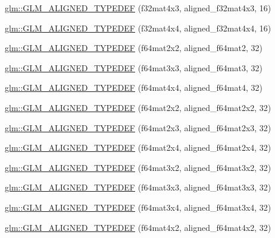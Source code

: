 \begin{DoxyCompactItemize}
\item 
\hyperlink{group__gtx__type__aligned_ga9476ef66790239df53dbe66f3989c3b5}{glm\+::\+G\+L\+M\+\_\+\+A\+L\+I\+G\+N\+E\+D\+\_\+\+T\+Y\+P\+E\+D\+E\+F} (f32mat4x3, aligned\+\_\+f32mat4x3, 16)
\item 
\hyperlink{group__gtx__type__aligned_gacc429b3b0b49921e12713b6d31e14e1d}{glm\+::\+G\+L\+M\+\_\+\+A\+L\+I\+G\+N\+E\+D\+\_\+\+T\+Y\+P\+E\+D\+E\+F} (f32mat4x4, aligned\+\_\+f32mat4x4, 16)
\item 
\hyperlink{group__gtx__type__aligned_ga88f6c6fa06e6e64479763e69444669cf}{glm\+::\+G\+L\+M\+\_\+\+A\+L\+I\+G\+N\+E\+D\+\_\+\+T\+Y\+P\+E\+D\+E\+F} (f64mat2x2, aligned\+\_\+f64mat2, 32)
\item 
\hyperlink{group__gtx__type__aligned_gaae8e4639c991e64754145ab8e4c32083}{glm\+::\+G\+L\+M\+\_\+\+A\+L\+I\+G\+N\+E\+D\+\_\+\+T\+Y\+P\+E\+D\+E\+F} (f64mat3x3, aligned\+\_\+f64mat3, 32)
\item 
\hyperlink{group__gtx__type__aligned_ga6e9094f3feb3b5b49d0f83683a101fde}{glm\+::\+G\+L\+M\+\_\+\+A\+L\+I\+G\+N\+E\+D\+\_\+\+T\+Y\+P\+E\+D\+E\+F} (f64mat4x4, aligned\+\_\+f64mat4, 32)
\item 
\hyperlink{group__gtx__type__aligned_gadbd2c639c03de1c3e9591b5a39f65559}{glm\+::\+G\+L\+M\+\_\+\+A\+L\+I\+G\+N\+E\+D\+\_\+\+T\+Y\+P\+E\+D\+E\+F} (f64mat2x2, aligned\+\_\+f64mat2x2, 32)
\item 
\hyperlink{group__gtx__type__aligned_gab059d7b9fe2094acc563b7223987499f}{glm\+::\+G\+L\+M\+\_\+\+A\+L\+I\+G\+N\+E\+D\+\_\+\+T\+Y\+P\+E\+D\+E\+F} (f64mat2x3, aligned\+\_\+f64mat2x3, 32)
\item 
\hyperlink{group__gtx__type__aligned_gabbc811d1c52ed2b8cfcaff1378f75c69}{glm\+::\+G\+L\+M\+\_\+\+A\+L\+I\+G\+N\+E\+D\+\_\+\+T\+Y\+P\+E\+D\+E\+F} (f64mat2x4, aligned\+\_\+f64mat2x4, 32)
\item 
\hyperlink{group__gtx__type__aligned_ga9ddf5212777734d2fd841a84439f3bdf}{glm\+::\+G\+L\+M\+\_\+\+A\+L\+I\+G\+N\+E\+D\+\_\+\+T\+Y\+P\+E\+D\+E\+F} (f64mat3x2, aligned\+\_\+f64mat3x2, 32)
\item 
\hyperlink{group__gtx__type__aligned_gad1dda32ed09f94bfcf0a7d8edfb6cf13}{glm\+::\+G\+L\+M\+\_\+\+A\+L\+I\+G\+N\+E\+D\+\_\+\+T\+Y\+P\+E\+D\+E\+F} (f64mat3x3, aligned\+\_\+f64mat3x3, 32)
\item 
\hyperlink{group__gtx__type__aligned_ga5875e0fa72f07e271e7931811cbbf31a}{glm\+::\+G\+L\+M\+\_\+\+A\+L\+I\+G\+N\+E\+D\+\_\+\+T\+Y\+P\+E\+D\+E\+F} (f64mat3x4, aligned\+\_\+f64mat3x4, 32)
\item 
\hyperlink{group__gtx__type__aligned_ga41e82cd6ac07f912ba2a2d45799dcf0d}{glm\+::\+G\+L\+M\+\_\+\+A\+L\+I\+G\+N\+E\+D\+\_\+\+T\+Y\+P\+E\+D\+E\+F} (f64mat4x2, aligned\+\_\+f64mat4x2, 32)

\end{DoxyCompactItemize}
